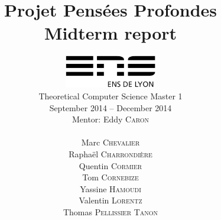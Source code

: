 \documentclass[a4paper,10pt]{report}
\title{Projet Pensées Profondes\\\large Midterm report}
\author{\includegraphics[width=0.3\textwidth]{../logo_ensl.eps}\\[50pt]
Theoretical Computer Science Master 1\\September 2014 \--- December 2014\\[50pt]
Mentor: Eddy \textsc{Caron}\\[50pt]
\begin{minipage}{0.4\textwidth}
    \begin{flushleft} \large
        Marc \textsc{Chevalier}
        \\
        Raphaël \textsc{Charrondière}
        \\
        Quentin \textsc{Cormier}
        \\
        Tom \textsc{Cornebize}
    \end{flushleft}
\end{minipage}
\begin{minipage}{0.4\textwidth}
    \begin{flushright} \large
        Yassine \textsc{Hamoudi}
        \\
        Valentin \textsc{Lorentz}
        \\
        Thomas \textsc{Pellissier Tanon}
        \\
    \end{flushright}
\end{minipage}
}
\date{}
\begin{document}
\maketitle



\tableofcontents



















\appendix


\nocite{*}
\end{document}
